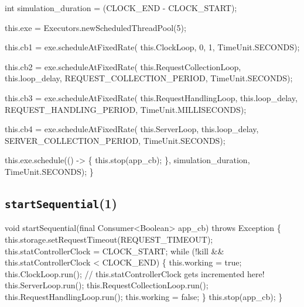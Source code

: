   int simulation_duration = (CLOCK_END - CLOCK_START);

  this.exe = Executors.newScheduledThreadPool(5);

  this.cb1 = exe.scheduleAtFixedRate(
    this.ClockLoop, 0, 1, TimeUnit.SECONDS);

  this.cb2 = exe.scheduleAtFixedRate(
    this.RequestCollectionLoop, this.loop_delay, REQUEST_COLLECTION_PERIOD, TimeUnit.SECONDS);

  this.cb3 = exe.scheduleAtFixedRate(
    this.RequestHandlingLoop, this.loop_delay, REQUEST_HANDLING_PERIOD, TimeUnit.MILLISECONDS);

  this.cb4 = exe.scheduleAtFixedRate(
    this.ServerLoop, this.loop_delay, SERVER_COLLECTION_PERIOD, TimeUnit.SECONDS);

  this.exe.schedule(() -> \{
    this.stop(app_cb);
  \}, simulation_duration, TimeUnit.SECONDS);
\}
\eatline
{}\nwendcode{}\nwdocspar
\subsection{\texttt{startSequential}(1)}
\nwenddocs{}\endmoddef{}
void startSequential(final Consumer<Boolean> app_cb) throws Exception \{
  this.storage.setRequestTimeout(REQUEST_TIMEOUT);
  this.statControllerClock = CLOCK_START;
  while (!kill && this.statControllerClock < CLOCK_END) \{
    this.working = true;
    this.ClockLoop.run();  // this.statControllerClock gets incremented here!
    this.ServerLoop.run();
    this.RequestCollectionLoop.run();
    this.RequestHandlingLoop.run();
    this.working = false;
  \}
  this.stop(app_cb);
\}
\eatline
{}\nwendcode{}\nwdocspar
